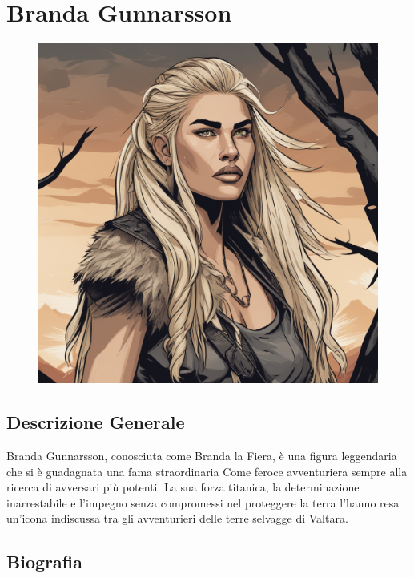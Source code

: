 \section{Branda Gunnarsson}\label{branda-gunnarsson}


\begin{figure}
\centering
\includegraphics{create-a-digital-illustration-of-branda-a-fierce-and-legendary-woman-with-long-blonde-hair-in-a-hal.png}
\end{figure}

\subsection{Descrizione Generale}\label{descrizione-generale}



Branda Gunnarsson, conosciuta come Branda la Fiera, è una figura
leggendaria che si è guadagnata una fama straordinaria Come feroce
avventuriera sempre alla ricerca di avversari più potenti. La sua forza
titanica, la determinazione inarrestabile e l'impegno senza compromessi
nel proteggere la terra l'hanno resa un'icona indiscussa tra gli
avventurieri delle terre selvagge di Valtara.

\subsection{Biografia}\label{biografia}


